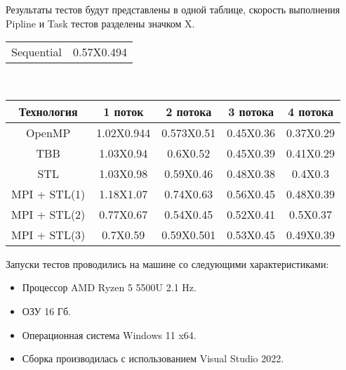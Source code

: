 \documentclass[12pt]{article}
\begin{document}
Результаты тестов будут представлены в одной таблице, скорость выполнения Pipline и Task тестов разделены значком X. \\

\begin{tabular}{|c|c|}
  \cline{1-2}
  Sequential & 0.57X0.494 \\
  \cline{1-2}
\end{tabular} 
\\

\begin{tabular}{|c|c|c|c|c|}
    \cline{1-5}
    Технология & 1 поток & 2 потока & 3 потока & 4 потока \\ \hline
    OpenMP & 1.02X0.944 & 0.573X0.51& 0.45X0.36& 0.37X0.29 \\ \hline
    TBB & 1.03X0.94& 0.6X0.52& 0.45X0.39& 0.41X0.29 \\ \hline
    STL & 1.03X0.98 & 0.59X0.46& 0.48X0.38 & 0.4X0.3\\ \hline
    MPI + STL(1) & 1.18X1.07 & 0.74X0.63& 0.56X0.45 & 0.48X0.39 \\ \hline
    MPI + STL(2) & 0.77X0.67& 0.54X0.45 & 0.52X0.41 & 0.5X0.37 \\ \hline
    MPI + STL(3) & 0.7X0.59 & 0.59X0.501 & 0.53X0.45 & 0.49X0.39 \\ \hline
    \cline{1-5}
\end{tabular}

Запуски тестов проводились на машине со следующими характеристиками:
\begin{itemize}
    \item Процессор AMD  Ryzen 5 5500U 2.1 Hz.
    \item ОЗУ 16 Гб.
    \item Операционная система Windows 11 x64.
    \item Сборка производилась с использованием Visual Studio 2022.
\end{itemize}
\end{document}
